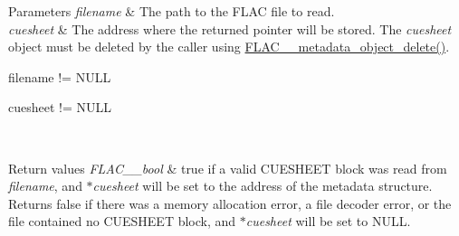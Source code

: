 \begin{DoxyParams}{Parameters}
{\em filename} & The path to the F\+L\+AC file to read. \\
\hline
{\em cuesheet} & The address where the returned pointer will be stored. The {\itshape cuesheet} object must be deleted by the caller using \hyperlink{group__flac__metadata__object_ga66bbe27dba68ba77be5af83986a280ea}{F\+L\+A\+C\+\_\+\+\_\+metadata\+\_\+object\+\_\+delete()}.  
\begin{DoxyCode}
filename != NULL 
\end{DoxyCode}
 
\begin{DoxyCode}
cuesheet != NULL 
\end{DoxyCode}
 \\
\hline
\end{DoxyParams}

\begin{DoxyRetVals}{Return values}
{\em F\+L\+A\+C\+\_\+\+\_\+bool} & {\ttfamily true} if a valid C\+U\+E\+S\+H\+E\+ET block was read from {\itshape filename}, and {\itshape $\ast$cuesheet} will be set to the address of the metadata structure. Returns {\ttfamily false} if there was a memory allocation error, a file decoder error, or the file contained no C\+U\+E\+S\+H\+E\+ET block, and {\itshape $\ast$cuesheet} will be set to {\ttfamily N\+U\+LL}. \\
\hline
\end{DoxyRetVals}
\mbox{\label{group__flac__metadata__level0_gaa13138ab038694909964998a113817b4}} 
